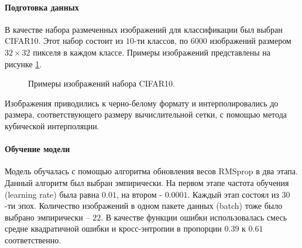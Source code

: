 \paragraph{Подготовка данных}
В качестве набора размеченных изображений для классификации был выбран CIFAR10. Этот набор состоит из $10$-ти классов, по $6000$ изображений размером $32 \times 32$ пикселя в каждом классе. Примеры изображений представлены на рисунке \ref{ris:CIFAR10}.
\begin{figure}[htbp]
	\caption{Примеры изображений набора CIFAR10.}
	\label{ris:CIFAR10}
\end{figure}
Изображения приводились к черно-белому формату и интерполировались до размера, соответствующего размеру вычислительной сетки, с помощью метода кубической интерполяции.

\paragraph{Обучение модели}
Модель обучалась с помощью алгоритма обновления весов RMSprop в два этапа. Данный алгоритм был выбран эмпирически. На первом этапе частота обучения (learning rate) была равна $0.01$, на втором - $0.0001$. Каждый этап состоял из $30$-ти эпох. Количество изображений в одном пакете данных (batch) тоже было выбрано эмпирически -- $22$. В качестве функции ошибки использовалась смесь средне квадратичной ошибки и кросс-энтропии в пропорции $0.39$ к $0.61$ соответственно.